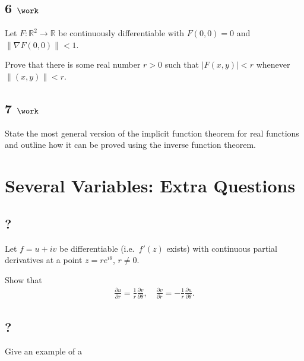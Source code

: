\hypertarget{work-14}{%
\subsection{\texorpdfstring{6
\(\work\)}{6 \textbackslash work}}\label{work-14}}

Let \(F:{\mathbb{R}}^2\to {\mathbb{R}}\) be continuously differentiable
with \(F(0, 0) = 0\) and
\({\left\lVert {\nabla F(0, 0)} \right\rVert} < 1\).

Prove that there is some real number \(r> 0\) such that
\({\left\lvert {F(x, y)} \right\rvert} < r\) whenever
\({\left\lVert {(x, y)} \right\rVert} < r\).

\hypertarget{work-15}{%
\subsection{\texorpdfstring{7
\(\work\)}{7 \textbackslash work}}\label{work-15}}

State the most general version of the implicit function theorem for real
functions and outline how it can be proved using the inverse function
theorem.

\hypertarget{several-variables-extra-questions}{%
\section{Several Variables: Extra
Questions}\label{several-variables-extra-questions}}

\hypertarget{section}{%
\subsection{?}\label{section}}

Let \(f=u+iv\) be differentiable (i.e.~\(f'(z)\) exists) with continuous
partial derivatives at a point \(z=re^{i\theta}\), \(r\not= 0\).

Show that
\begin{align*}
\frac{\partial u}{\partial r}=\frac{1}{r}\frac{\partial v}{\partial \theta},\quad
\frac{\partial v}{\partial r}=-\frac{1}{r}\frac{\partial u}{\partial \theta}
.\end{align*}

\hypertarget{section-1}{%
\subsection{?}\label{section-1}}

Give an example of a

